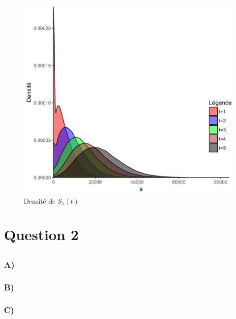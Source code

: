 \documentclass[12pt, french]{report}
\begin{document}
\begin{figure}[!ht]
    \centering
    \caption{Densité de $S_1(t)$}
    \label{GRAPH:Densite processus 1}
    \includegraphics[scale=0.7]{Graphiques/densite_Fn_S_1.png}
\end{figure}




\chapter*{Question 2}
\addtocounter{chapter}{1}
\setcounter{section}{0}
\section{}
\subsection*{A)}

\subsection*{B)}

\subsection*{C)}

\section{}
\end{document}
